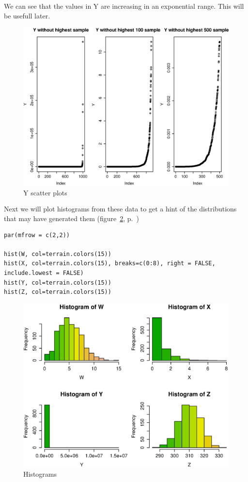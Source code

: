 \documentclass{article}
\begin{document}
\begin{enumerate}
  We can see that the values in Y are increasing in an exponential range. This
  will be usefull later.
  
  \begin{figure}[H]
  \centering
  \includegraphics[scale=0.6]{scattery.eps}
  \caption{Y scatter plots}
  \label{fig:scattery}
  \end{figure}
  
  Next we will plot histograms from these data to get a hint of the
  distributions that may have generated them (figure~\ref{fig:histograms},
  p.~\pageref{fig:histograms})
  
  \begin{lstlisting}
par(mfrow = c(2,2))

hist(W, col=terrain.colors(15))
hist(X, col=terrain.colors(15), breaks=c(0:8), right = FALSE, include.lowest = FALSE)
hist(Y, col=terrain.colors(15))
hist(Z, col=terrain.colors(15))
  \end{lstlisting}
  
  \begin{figure}[H]
  \centering
  \includegraphics[scale=0.6]{histograms.eps}
  \caption{Histograms}
  \label{fig:histograms}
  \end{figure}
  

\end{enumerate}
\end{document}

